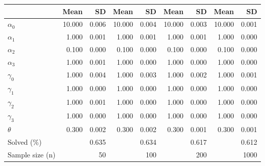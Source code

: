 
\begin{tabular}[t]{lrrrrrrrr}
\toprule
  & Mean & SD & Mean  & SD  & Mean   & SD   & Mean    & SD   \\
\midrule
$\alpha_{0}$ & 10.000 & 0.006 & 10.000 & 0.004 & 10.000 & 0.003 & 10.000 & 0.001\\
$\alpha_{1}$ & 1.000 & 0.001 & 1.000 & 0.001 & 1.000 & 0.001 & 1.000 & 0.000\\
$\alpha_{2}$ & 0.100 & 0.000 & 0.100 & 0.000 & 0.100 & 0.000 & 0.100 & 0.000\\
$\alpha_{3}$ & 1.000 & 0.001 & 1.000 & 0.000 & 1.000 & 0.000 & 1.000 & 0.000\\
$\gamma_{0}$ & 1.000 & 0.004 & 1.000 & 0.003 & 1.000 & 0.002 & 1.000 & 0.001\\
$\gamma_{1}$ & 1.000 & 0.000 & 1.000 & 0.000 & 1.000 & 0.000 & 1.000 & 0.000\\
$\gamma_{2}$ & 1.000 & 0.001 & 1.000 & 0.000 & 1.000 & 0.000 & 1.000 & 0.000\\
$\gamma_{3}$ & 1.000 & 0.000 & 1.000 & 0.000 & 1.000 & 0.000 & 1.000 & 0.000\\
$\theta$ & 0.300 & 0.002 & 0.300 & 0.002 & 0.300 & 0.001 & 0.300 & 0.001\\
Solved (\%) &  & 0.635 &  & 0.634 &  & 0.617 &  & 0.612\\
Sample size (n) &  & 50 &  & 100 &  & 200 &  & 1000\\
\bottomrule
\end{tabular}
